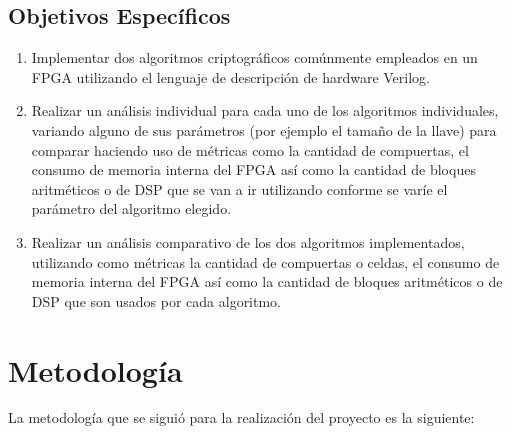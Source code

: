 \subsection{Objetivos Específicos}

\begin{enumerate}

\item Implementar dos algoritmos criptográficos comúnmente empleados en un FPGA utilizando el lenguaje de descripción de hardware Verilog.

\item Realizar un análisis individual para cada uno de los algoritmos individuales, variando alguno de sus parámetros (por ejemplo el tamaño de la llave) para comparar haciendo uso de métricas como la cantidad de compuertas, el consumo de memoria interna del FPGA así como la cantidad de bloques aritméticos o de DSP que se van a ir utilizando conforme se varíe el parámetro del algoritmo elegido.

\item Realizar un análisis comparativo de los dos algoritmos implementados, utilizando como métricas la cantidad de compuertas o celdas, el consumo de memoria interna del FPGA así como la cantidad de bloques aritméticos o de DSP que son usados por cada algoritmo.


\end{enumerate}

\section{Metodología}

La metodología que se siguió para la realización del proyecto es la siguiente:

